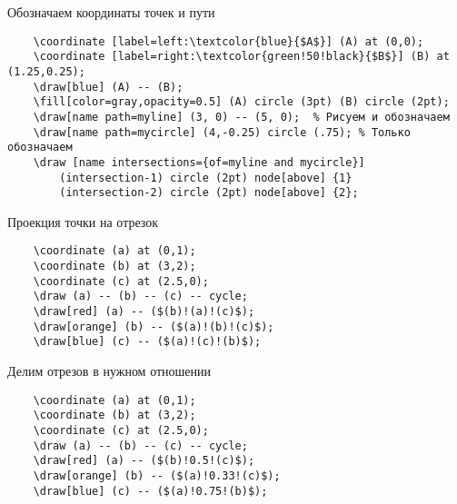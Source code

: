 \documentclass[a4paper,12pt]{article}
\begin{document}
Обозначаем координаты точек и пути
\begin{verbatim}
    \coordinate [label=left:\textcolor{blue}{$A$}] (A) at (0,0);
    \coordinate [label=right:\textcolor{green!50!black}{$B$}] (B) at (1.25,0.25);
    \draw[blue] (A) -- (B);
    \fill[color=gray,opacity=0.5] (A) circle (3pt) (B) circle (2pt);
    \draw[name path=myline] (3, 0) -- (5, 0);  % Рисуем и обозначаем
    \draw[name path=mycircle] (4,-0.25) circle (.75); % Только обозначаем
    \draw [name intersections={of=myline and mycircle}]
        (intersection-1) circle (2pt) node[above] {1}
        (intersection-2) circle (2pt) node[above] {2};
\end{verbatim}




\newpage

Проекция точки на отрезок
\begin{verbatim}
    \coordinate (a) at (0,1);
    \coordinate (b) at (3,2);
    \coordinate (c) at (2.5,0);
    \draw (a) -- (b) -- (c) -- cycle;
    \draw[red] (a) -- ($(b)!(a)!(c)$);
    \draw[orange] (b) -- ($(a)!(b)!(c)$);
    \draw[blue] (c) -- ($(a)!(c)!(b)$);
\end{verbatim}



Делим отрезов в нужном отношении
\begin{verbatim}
    \coordinate (a) at (0,1);
    \coordinate (b) at (3,2);
    \coordinate (c) at (2.5,0);
    \draw (a) -- (b) -- (c) -- cycle;
    \draw[red] (a) -- ($(b)!0.5!(c)$);
    \draw[orange] (b) -- ($(a)!0.33!(c)$);
    \draw[blue] (c) -- ($(a)!0.75!(b)$);
\end{verbatim}
\end{document}
